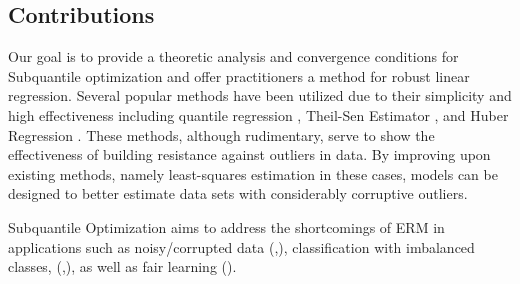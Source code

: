 \documentclass{article} %
\begin{document}
	\subsection{Contributions}
	Our goal is to provide a theoretic analysis and convergence conditions for Subquantile optimization and offer practitioners a method for robust linear regression.
	Several popular methods have been utilized due to their simplicity and high effectiveness including quantile regression \cite{quantile-regression}, Theil-Sen Estimator \cite{thiel-sen}, and Huber Regression \cite{Huber2009}. These methods, although rudimentary, serve to show the effectiveness of building resistance against outliers in data. By improving upon existing methods, namely least-squares estimation in these cases, models can be designed to better estimate data sets with considerably corruptive outliers.
	
	Subquantile Optimization aims to address the shortcomings of ERM in applications such as noisy/corrupted data (\cite{khetan2018learning},\cite{jiang2018mentornet}), classification with imbalanced classes, (\cite{lin2017dense},\cite{he2009imbalanced}), as well as fair learning (\cite{Corbett2018fairness}).
	
\end{document}
